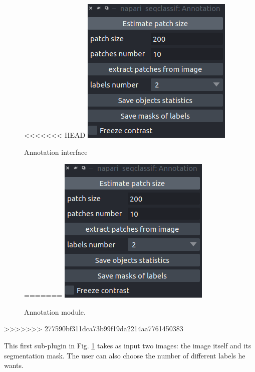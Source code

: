\documentclass{article}
\begin{document}
\begin{figure}
 \centering
<<<<<<< HEAD
 \includegraphics[scale=0.18]{Figures/annotation.png}
  \caption{Annotation interface}
  \label{labelization}
=======
 \includegraphics[width=1\linewidth]{Figures/annotation.png}
  \caption{Annotation module. \label{fig:patch}}
\end{figure}
>>>>>>> 277590bf311dca73b99f19da2214aa7761450383



This first sub-plugin in Fig. \ref{fig:patch} takes as input two images: the image itself and its segmentation mask. The user can also choose the number of different labels he wants.
\end{document}
